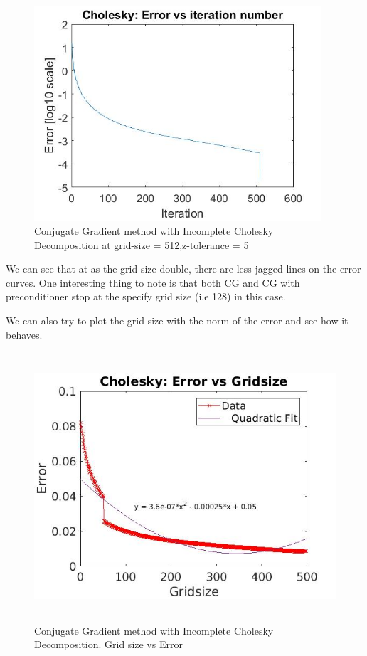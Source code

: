 \documentclass{article}
\begin{document}
\begin{figure}[H]
	\includegraphics[width=\linewidth,height=80mm]{512.jpg}
	\caption{Conjugate Gradient method with Incomplete Cholesky Decomposition at grid-size = 512,z-tolerance = 5}	
\end{figure}

\noindent
We can see that at as the grid size double, there are less jagged lines on the error curves. One interesting thing to note is that both CG and CG with preconditioner stop at the specify grid size (i.e 128) in this case. 

\noindent
We can also try to plot the grid size with the norm of the error and see how it behaves. 

\begin{figure}[H]
	\includegraphics[width=\linewidth,height=100mm]{error_plot_CG.jpg}
	\caption{Conjugate Gradient method with Incomplete Cholesky Decomposition. Grid size vs Error}	
\end{figure}
\end{document}
